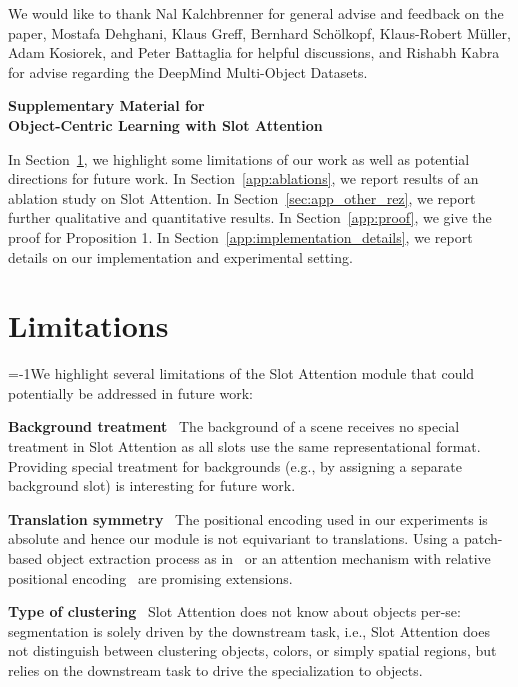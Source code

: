 \documentclass{article}
\begin{document}
\begin{ack}
We would like to thank Nal Kalchbrenner for general advise and feedback on the paper, Mostafa Dehghani, Klaus Greff, Bernhard Schölkopf, Klaus-Robert Müller, Adam Kosiorek, and Peter Battaglia for helpful discussions, and Rishabh Kabra for advise regarding the DeepMind Multi-Object Datasets.
\end{ack}

{\small

}

\newpage
\appendix

\begin{center}
\parbox{.8\linewidth}{%
	\centering\Large
	\textbf{Supplementary Material for \\Object-Centric Learning with Slot Attention}
}
\end{center}
In Section~\ref{sec:app-limitations}, we highlight some limitations of our work as well as potential directions for future work. In Section~\ref{app:ablations}, we report results of an ablation study on Slot Attention. In Section~\ref{sec:app_other_rez}, we report further qualitative and quantitative results. In Section~\ref{app:proof}, we give the proof for Proposition 1. In Section~\ref{app:implementation_details}, we report details on our implementation and experimental setting.

\section{Limitations}\label{sec:app-limitations}
\looseness=-1We highlight several limitations of the Slot Attention module that could potentially be addressed in future work:

\textbf{Background treatment} \ The background of a scene receives no special treatment in Slot Attention as all slots use the same representational format. Providing special treatment for backgrounds (e.g., by assigning a separate background slot) is interesting for future work.

\textbf{Translation symmetry} \ The positional encoding used in our experiments is absolute and hence our module is not equivariant to translations. Using a patch-based object extraction process as in~\citep{lin2020space} or an attention mechanism with relative positional encoding~\citep{shaw2018self} are promising extensions.

\textbf{Type of clustering} \ Slot Attention does not know about objects per-se: segmentation is solely driven by the downstream task, i.e., Slot Attention does not distinguish between clustering objects, colors, or simply spatial regions, but relies on the downstream task to drive the specialization to objects.
\end{document}
